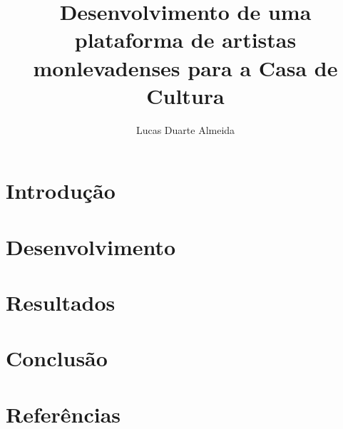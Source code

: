 \documentclass{beamer}
\title{Desenvolvimento de uma plataforma de artistas monlevadenses para a Casa de Cultura}
\author{Lucas Duarte Almeida}
\begin{document}
\maketitle

\section{Introdução}


\section{Desenvolvimento}


\section{Resultados}


\section{Conclusão}


\section{Referências}


\backmatter
\end{document}

